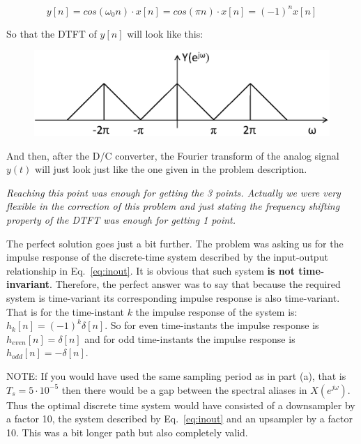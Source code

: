 \documentclass[a4paper,11pt,oneside]{article}
\begin{document}
\begin{equation}\label{eq:inout}
y[n] = cos(\omega_0 n)\cdot x[n]=cos(\pi n)\cdot x[n]=(-1)^n x[n]
\end{equation}

So that the DTFT of $y[n]$ will look like this:

\begin{figure}[h!]
\centering
\includegraphics[width=.8\textwidth]{ex3sol1fig2.eps}
\end{figure}

And then, after the D/C converter, the Fourier transform of the analog signal $y(t)$ will just look just like the one given in the problem description. 

\emph{Reaching this point was enough for getting the 3 points. Actually we were very flexible in the correction of this problem and just stating the frequency shifting property of the DTFT was enough for getting 1 point.} 

The perfect solution goes just a bit further. The problem was asking us for the impulse response of the discrete-time system described by the input-output relationship in Eq.~\ref{eq:inout}. It is obvious that such system \textbf{is not time-invariant}. Therefore, the perfect answer was to say that because the required system is time-variant its corresponding impulse response is also time-variant. That is for the time-instant $k$ the impulse response of the system is: $h_k[n]=(-1)^k \delta[n]$. So for even time-instants the impulse response is $h_{even}[n]=\delta[n]$ and for odd time-instants the impulse response is $h_{odd}[n]=-\delta[n]$.

NOTE: If you would have used the same sampling period as in part (a), that is $T_s=5\cdot 10^{-5}$ then there would be a gap between the spectral aliases in $X(e^{j\omega})$. Thus the optimal discrete time system would have consisted of a downsampler by a factor 10, the system described by Eq.~\ref{eq:inout} and an upsampler by a factor 10. This was a bit longer path but also completely valid.
\end{document}
